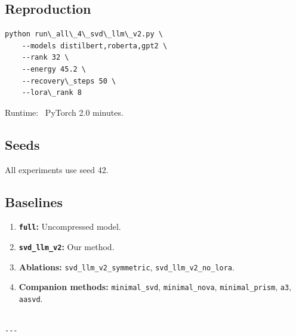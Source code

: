 \subsection{Reproduction}

\begin{lstlisting}
python run\_all\_4\_svd\_llm\_v2.py \
    --models distilbert,roberta,gpt2 \
    --rank 32 \
    --energy 45.2 \
    --recovery\_steps 50 \
    --lora\_rank 8
\end{lstlisting}

Runtime: ~PyTorch 2.0 minutes.

\subsection{Seeds}

All experiments use seed 42.

\subsection{Baselines}

\begin{enumerate}
\item \textbf{\texttt{full}:} Uncompressed model.
\item \textbf{\texttt{svd\_llm\_v2}:} Our method.
\item \textbf{Ablations:} \texttt{svd\_llm\_v2\_symmetric}, \texttt{svd\_llm\_v2\_no\_lora}.
\item \textbf{Companion methods:} \texttt{minimal\_svd}, \texttt{minimal\_nova}, \texttt{minimal\_prism}, \texttt{a3}, \texttt{aasvd}.
\end{enumerate}
\begin{lstlisting}

---
\end{lstlisting}